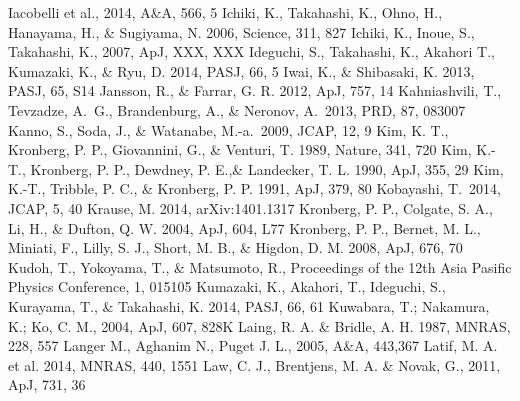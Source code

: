 \begin{thebibliography}{99}
\begin{multicols}{2}
{
	Iacobelli et al., 2014, A\&A, 566, 5
	Ichiki, K., Takahashi, K., Ohno, H., Hanayama, H., \& Sugiyama, N. 2006, Science, 311, 827
	Ichiki, K., Inoue, S., Takahashi, K., 2007, ApJ, XXX, XXX
	Ideguchi, S., Takahashi, K., Akahori T., Kumazaki, K., \& Ryu, D. 2014, PASJ, 66, 5
	Iwai, K., \& Shibasaki, K. 2013, PASJ, 65, S14
	Jansson, R., \& Farrar, G. R. 2012, ApJ, 757, 14
	Kahniashvili, T., Tevzadze, A.~G., Brandenburg, A., \& Neronov, A.\ 2013, PRD, 87, 083007
	Kanno, S., Soda, J., \& Watanabe, M.-a.\ 2009, JCAP, 12, 9
	Kim, K. T., Kronberg, P. P., Giovannini, G., \& Venturi, T. 1989, Nature, 341, 720
	Kim, K.-T., Kronberg, P. P., Dewdney, P. E.,\& Landecker, T. L. 1990, ApJ, 355, 29
	Kim, K.-T., Tribble, P. C., \& Kronberg, P. P. 1991, ApJ, 379, 80
	Kobayashi, T.\ 2014, JCAP, 5, 40
	Krause, M. 2014, arXiv:1401.1317
	Kronberg, P. P., Colgate, S. A., Li, H., \& Dufton, Q. W. 2004, ApJ, 604, L77
	Kronberg, P. P., Bernet, M. L., Miniati, F., Lilly, S. J., Short, M. B., \& Higdon, D. M. 2008, ApJ, 676, 70
	Kudoh, T., Yokoyama, T., \& Matsumoto, R., Proceedings of the 12th Asia Pasific Physics Conference, 1, 015105
	Kumazaki, K., Akahori, T., Ideguchi, S., Kurayama, T., \& Takahashi, K. 2014, PASJ, 66, 61
	Kuwabara, T.; Nakamura, K.; Ko, C. M., 2004, ApJ, 607, 828K
	Laing, R. A. \& Bridle, A. H. 1987, MNRAS, 228, 557
	Langer M., Aghanim N., Puget J. L., 2005, A\&A, 443,367
	Latif, M. A. et al. 2014, MNRAS, 440, 1551
	Law, C. J., Brentjens, M. A. \& Novak, G., 2011, ApJ, 731, 36
}
\end{multicols}
\end{thebibliography}
